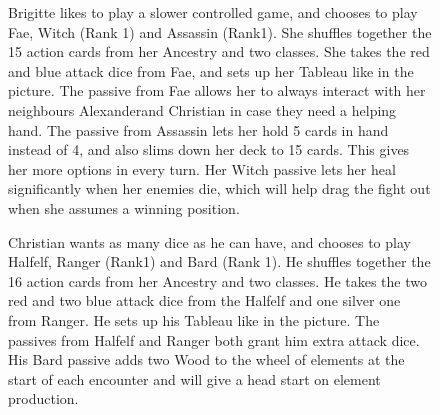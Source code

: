 \begin{figure}[ht]
	\begin{minipage}[t][6cm][t]{0.5\textwidth}
		Brigitte likes to play a slower controlled game, and chooses to play Fae, Witch (Rank 1) and Assassin (Rank1). She shuffles together the 15 action cards from her Ancestry and two classes. She takes the red and blue attack dice from Fae, and sets up her Tableau like in the picture. The passive from Fae allows her to always interact with her neighbours Alexanderand Christian in case they need a helping hand. The passive from Assassin lets her hold 5 cards in hand instead of 4, and also slims down her deck to 15 cards. This gives her more options in every turn. Her Witch passive lets her heal significantly when her enemies die, which will help drag the fight out when she assumes a winning position.
		
	\end{minipage}	
	\begin{minipage}[t][6cm][t]{0.5\textwidth}
	\end{minipage}
	
\end{figure}


\begin{figure}[ht]
	\begin{minipage}[t][5cm][t]{0.5\textwidth}
	\end{minipage}
	\begin{minipage}[t][9cm][t]{0.5\textwidth}
		Christian wants as many dice as he can have, and chooses to play Halfelf, Ranger (Rank1) and Bard (Rank 1). He shuffles together the 16 action cards from her Ancestry and two classes. He takes the two red and two blue attack dice from the Halfelf and one silver one from Ranger. He sets up his Tableau like in the picture. The passives from Halfelf and Ranger both grant him extra attack dice. His Bard passive adds two Wood to the wheel of elements at the start of each encounter and will give a head start on element production.
		
	\end{minipage}	
\end{figure}

